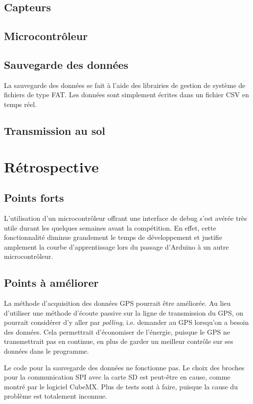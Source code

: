 \subsection{Capteurs}



\subsection{Microcontrôleur}



\subsection{Sauvegarde des données}

La sauvegarde des données se fait à l'aide des librairies de gestion de système
de fichiers de type FAT. Les données sont simplement écrites dans un fichier
CSV en temps réel.

\subsection{Transmission au sol}



\section{Rétrospective}

\subsection{Points forts}

L'utilisation d'un microcontrôleur offrant une interface de debug s'est avérée
très utile durant les quelques semaines avant la compétition. En effet, cette
fonctionnalité diminue grandement le temps de développement et justifie
amplement la courbe d'apprentissage lors du passage d'Arduino à un autre
microcontrôleur.
\par


\subsection{Points à améliorer}

La méthode d'acquisition des données GPS pourrait être améliorée. Au lieu
d'utiliser une méthode d'écoute passive sur la ligne de transmission du GPS, on
pourrait considérer d'y aller par \textit{polling}, i.e. demander au GPS
lorsqu'on a besoin des données. Cela permettrait d'économiser de l'énergie,
puisque le GPS ne transmettrait pas en continue, en plus de garder un meilleur
contrôle sur ses données dans le programme.
\\
\par
Le code pour la sauvegarde des données ne fonctionne pas. Le choix des broches
pour la communication SPI avec la carte SD est peut-être en cause, comme montré
par le logiciel CubeMX. Plus de tests sont à faire, puisque la cause du
problème est totalement inconnue.
